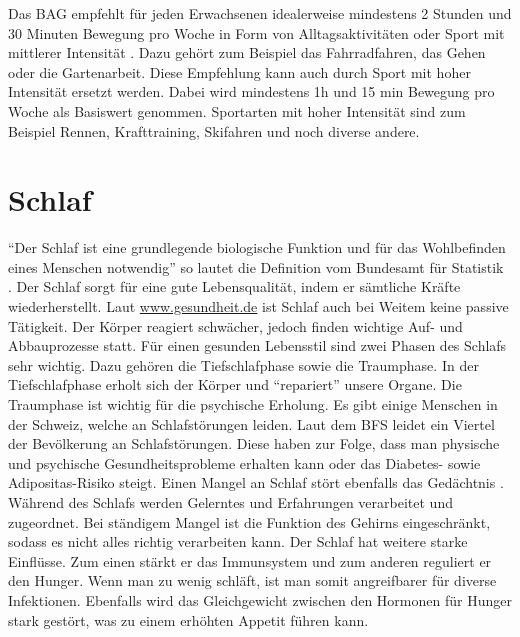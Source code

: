 Das BAG empfehlt für jeden Erwachsenen idealerweise mindestens 2 Stunden und 30 Minuten Bewegung pro Woche in Form von Alltagsaktivitäten oder Sport mit mittlerer Intensität \cite{bewegungsfoerderung}. Dazu gehört zum Beispiel das Fahrradfahren, das Gehen oder die Gartenarbeit. Diese Empfehlung kann auch durch Sport mit hoher Intensität ersetzt werden. Dabei wird mindestens 1h und 15 min Bewegung pro Woche als Basiswert genommen. Sportarten mit hoher Intensität sind zum Beispiel Rennen, Krafttraining, Skifahren und noch diverse andere. 
\section{Schlaf}
\authortoc{\bastian}{\sectionident}
“Der Schlaf ist eine grundlegende biologische Funktion und für das Wohlbefinden eines Menschen notwendig” so lautet die Definition vom Bundesamt für Statistik \cite{bundesamtfrstatistik_2015_schlafstoerungen}.
\newline
Der Schlaf sorgt für eine gute Lebensqualität, indem er sämtliche Kräfte wiederherstellt. Laut \url{www.gesundheit.de} ist Schlaf auch bei Weitem keine passive Tätigkeit. Der Körper reagiert schwächer, jedoch finden wichtige Auf- und Abbauprozesse statt. Für einen gesunden Lebensstil sind zwei Phasen des Schlafs sehr wichtig. Dazu gehören die Tiefschlafphase sowie die Traumphase. In der Tiefschlafphase erholt sich der Körper und “repariert” unsere Organe. Die Traumphase ist wichtig für die psychische Erholung. Es gibt einige Menschen in der Schweiz, welche an Schlafstörungen leiden. Laut dem BFS leidet ein Viertel der Bevölkerung an Schlafstörungen. Diese haben zur Folge, dass man physische und psychische Gesundheitsprobleme erhalten kann oder das Diabetes- sowie Adipositas-Risiko steigt. Einen Mangel an Schlaf stört ebenfalls das Gedächtnis \cite{schlaf-grundbeduerfnis-und-lebenselixier}. Während des Schlafs werden Gelerntes und Erfahrungen verarbeitet und zugeordnet. Bei ständigem Mangel ist die Funktion des Gehirns eingeschränkt, sodass es nicht alles richtig verarbeiten kann. Der Schlaf hat weitere starke Einflüsse. Zum einen stärkt er das Immunsystem und zum anderen reguliert er den Hunger. Wenn man zu wenig schläft, ist man somit angreifbarer für diverse Infektionen. Ebenfalls wird das Gleichgewicht zwischen den Hormonen für Hunger stark gestört, was zu einem erhöhten Appetit führen kann.
